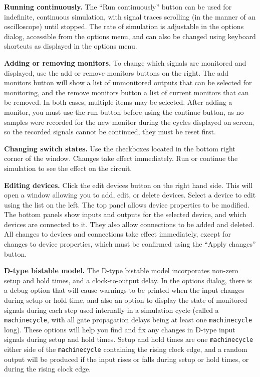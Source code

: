 \documentclass[a4paper,10pt]{article}
\begin{document}
\textbf{Running continuously.} The ``Run continuously'' button can be used for indefinite, continuous simulation, with signal traces scrolling (in the manner of an oscilloscope) until stopped. The rate of simulation is adjustable in the options dialog, accessible from the options menu, and can also be changed using keyboard shortcuts as displayed in the options menu. 

\textbf{Adding or removing monitors.} To change which signals are monitored and displayed, use the add or remove monitors buttons on the right. The add monitors button will show a list of unmonitored outputs that can be selected for monitoring, and the remove monitors button a list of current monitors that can be removed. In both cases, multiple items may be selected. After adding a monitor, you must use the run button before using the continue button, as no samples were recorded for the new monitor during the cycles displayed on screen, so the recorded signals cannot be continued, they must be reset first. 

\textbf{Changing switch states.} Use the checkboxes located in the bottom right corner of the window. Changes take effect immediately. Run or continue the simulation to see the effect on the circuit. 

\textbf{Editing devices.} Click the edit devices button on the right hand side. This will open a window allowing you to add, edit, or delete devices. Select a device to edit using the list on the left. The top panel allows device properties to be modified. The bottom panels show inputs and outputs for the selected device, and which devices are connected to it. They also allow connections to be added and deleted. All changes to devices and connections take effect immediately, except for changes to device properties, which must be confirmed using the ``Apply changes'' button. 

\textbf{D-type bistable model.} The D-type bistable model incorporates non-zero setup and hold times, and a clock-to-output delay. In the options dialog, there is a debug option that will cause warnings to be printed when the input changes during setup or hold time, and also an option to display the state of monitored signals during each step used internally in a simulation cycle (called a \texttt{machinecycle}, with all gate propagation delays being at least one \texttt{machinecycle} long). These options will help you find and fix any changes in D-type input signals during setup and hold times. Setup and hold times are one \texttt{machinecycle} either side of the \texttt{machinecycle} containing the rising clock edge, and a random output will be produced if the input rises or falls during setup or hold times, or during the rising clock edge. 
\end{document}
